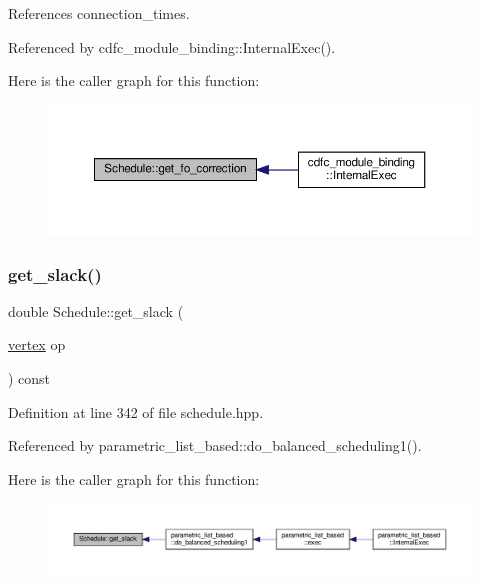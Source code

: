 References connection\+\_\+times.



Referenced by cdfc\+\_\+module\+\_\+binding\+::\+Internal\+Exec().

Here is the caller graph for this function\+:
\nopagebreak
\begin{figure}[H]
\begin{center}
\leavevmode
\includegraphics[width=350pt]{df/d61/classSchedule_a3c418e4bcd41ae0e8b88c117d377f227_icgraph}
\end{center}
\end{figure}
\mbox{\label{classSchedule_a010703d799e98d8c5c3bb7e59ac635c3}} 
\subsubsection{\texorpdfstring{get\+\_\+slack()}{get\_slack()}}
{\footnotesize\ttfamily double Schedule\+::get\+\_\+slack (\begin{DoxyParamCaption}\item[{\hyperlink{graph_8hpp_abefdcf0544e601805af44eca032cca14}{vertex}}]{op }\end{DoxyParamCaption}) const\hspace{0.3cm}{\ttfamily [inline]}}



Definition at line 342 of file schedule.\+hpp.



Referenced by parametric\+\_\+list\+\_\+based\+::do\+\_\+balanced\+\_\+scheduling1().

Here is the caller graph for this function\+:
\nopagebreak
\begin{figure}[H]
\begin{center}
\leavevmode
\includegraphics[width=350pt]{df/d61/classSchedule_a010703d799e98d8c5c3bb7e59ac635c3_icgraph}
\end{center}
\end{figure}
\mbox{\label{classSchedule_a289a13765e99b83118877fdec668fff1}} 
